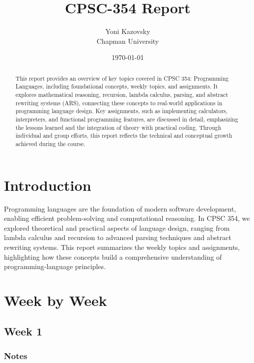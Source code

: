 \documentclass{article}
\title{CPSC-354 Report}
\author{Yoni Kazovsky  \\ Chapman University}
\date{\today}
\theoremstyle{theorem}
\theoremstyle{definition}
\theoremstyle{remark}
\begin{document}
\maketitle

\begin{abstract}
This report provides an overview of key topics covered in CPSC 354: Programming Languages, including foundational concepts, weekly topics, and assignments. It explores mathematical reasoning, recursion, lambda calculus, parsing, and abstract rewriting systems (ARS), connecting these concepts to real-world applications in programming language design. Key assignments, such as implementing calculators, interpreters, and functional programming features, are discussed in detail, emphasizing the lessons learned and the integration of theory with practical coding. Through individual and group efforts, this report reflects the technical and conceptual growth achieved during the course.
\end{abstract}

\setcounter{tocdepth}{3}
\tableofcontents

\section{Introduction}\label{intro}

Programming languages are the foundation of modern software development, enabling efficient problem-solving and computational reasoning. In CPSC 354, we explored theoretical and practical aspects of language design, ranging from lambda calculus and recursion to advanced parsing techniques and abstract rewriting systems. This report summarizes the weekly topics and assignments, highlighting how these concepts build a comprehensive understanding of programming-language principles. 

\section{Week by Week}\label{homework}

\subsection{Week 1}



\subsubsection*{Notes}
\end{document}
